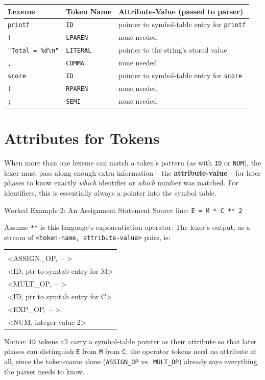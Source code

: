 \documentclass[full-course-notes.tex]{subfiles}
\begin{document}
\begin{center}
\renewcommand{\arraystretch}{1.25}
\begin{tabularx}{\textwidth}{@{}l l X@{}}
\toprule
\textbf{Lexeme} & \textbf{Token Name} & \textbf{Attribute-Value (passed to parser)} \\
\midrule
\texttt{printf} & \texttt{ID} & pointer to symbol-table entry for \texttt{printf} \\
\texttt{(} & \texttt{LPAREN} & none needed \\
\texttt{"Total = \%d\textbackslash n"} & \texttt{LITERAL} & pointer to the string's stored value \\
\texttt{,} & \texttt{COMMA} & none needed \\
\texttt{score} & \texttt{ID} & pointer to symbol-table entry for \texttt{score} \\
\texttt{)} & \texttt{RPAREN} & none needed \\
\texttt{;} & \texttt{SEMI} & none needed \\
\bottomrule
\end{tabularx}
\end{center}

\section{Attributes for Tokens}
\label{sec:l3-attributes}

\dbtag When more than one lexeme can match a token's pattern (as with \texttt{ID} or
\texttt{NUM}), the lexer must pass along enough extra information -- the \textbf{attribute-value}
-- for later phases to know exactly \emph{which} identifier or \emph{which} number was matched.
For identifiers, this is essentially always a pointer into the symbol table.

\begin{examplebox}{Worked Example 2: An Assignment Statement}
Source line: \quad \texttt{E = M * C ** 2}

Assume \texttt{**} is this language's exponentiation operator. The lexer's output, as a stream
of \texttt{<token-name, attribute-value>} pairs, is:
\begin{center}
\ttfamily
\begin{tabular}{@{}l@{}}
 \\
<ASSIGN\_OP,\ -- >  \\
<ID, ptr to symtab entry for M> \\
<MULT\_OP,\ -- > \\
<ID, ptr to symtab entry for C> \\
<EXP\_OP,\ -- > \\
<NUM, integer value 2>
\end{tabular}
\end{center}
Notice: \texttt{ID} tokens all carry a symbol-table pointer as their attribute so that later
phases can distinguish \texttt{E} from \texttt{M} from \texttt{C}; the operator tokens need no
attribute at all, since the token-name alone (\texttt{ASSIGN\_OP} vs.\ \texttt{MULT\_OP}) already
says everything the parser needs to know.
\end{examplebox}
\end{document}
